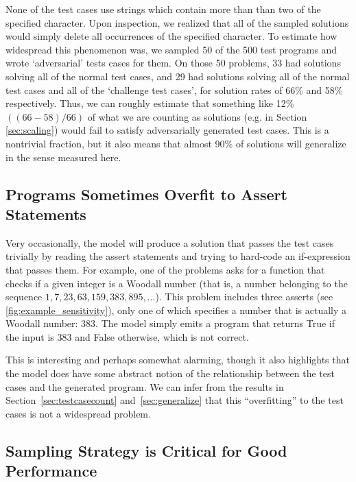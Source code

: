 None of the test cases use strings which contain more than than two of the specified character. Upon inspection, we realized that all of the sampled solutions would simply delete all occurrences of the specified character. To estimate how widespread this phenomenon was, we sampled 50 of the 500 test programs and wrote `adversarial' tests cases for them. On those 50 problems, 33 had solutions solving all of the normal test cases, and 29 had solutions solving all of the normal test cases and all of the `challenge test cases', for solution rates of 66\% and 58\% respectively. Thus, we can roughly estimate that something like 12\% $((66 - 58) / 66)$ of what we are counting as solutions (e.g. in Section \ref{sec:scaling}) would fail to satisfy adversarially generated test cases. This is a nontrivial fraction, but it also means that almost 90\% of solutions will generalize in the sense measured here.

\subsection{Programs Sometimes Overfit to Assert Statements}
\label{sec:overfitting}
Very occasionally, the model will produce a solution that passes the test cases trivially by reading the assert statements and trying to hard-code an if-expression that passes them. For example, one of the problems asks for a function that checks if a given integer is a Woodall number (that is, a number belonging to the sequence $1,7,23,63,159,383,895, ...$). This problem includes three asserts (see \autoref{fig:example_sensitivity}), only one of which specifies a number that is actually a Woodall number: 383. The model simply emits a program that returns True if the input is 383 and False otherwise, which is not correct.

This is interesting and perhaps somewhat alarming, though it also highlights that the model does have some abstract notion of the relationship between the test cases and the generated program. We can infer from the results in Section~\ref{sec:testcasecount} and~\ref{sec:generalize} that this ``overfitting'' to the test cases is not a widespread problem. 

\subsection{Sampling Strategy is Critical for Good Performance}
\label{sec:temperature}


